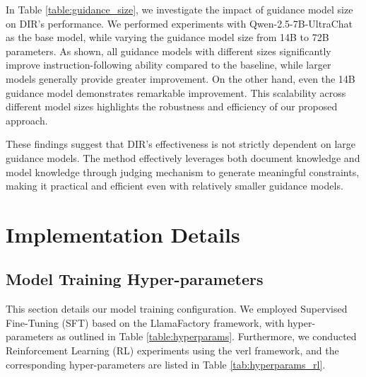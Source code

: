 In Table \ref{table:guidance_size}, we investigate the impact of guidance model size on DIR's performance. We performed experiments with Qwen-2.5-7B-UltraChat as the base model, while varying the guidance model size from 14B to 72B parameters. As shown, all guidance models with different sizes significantly improve instruction-following ability compared to the baseline, while larger models generally provide greater improvement. On the other hand, even the 14B guidance model demonstrates remarkable improvement. This scalability across different model sizes highlights the robustness and efficiency of our proposed approach.

These findings suggest that DIR's effectiveness is not strictly dependent on large guidance models. The method effectively leverages both document knowledge and model knowledge through judging mechanism to generate meaningful constraints, making it practical and efficient even with relatively smaller guidance models.

\section{Implementation Details}
\label{appendix:additional_details}

\subsection{Model Training Hyper-parameters}
\label{appendix:hyper-parameters}

This section details our model training configuration. We employed Supervised Fine-Tuning (SFT) based on the LlamaFactory \cite{zheng2024llamafactory} framework, with hyper-parameters as outlined in Table \ref{table:hyperparams}. Furthermore, we conducted Reinforcement Learning (RL) experiments using the verl \cite{verl} framework, and the corresponding hyper-parameters are listed in Table \ref{tab:hyperparams_rl}.

